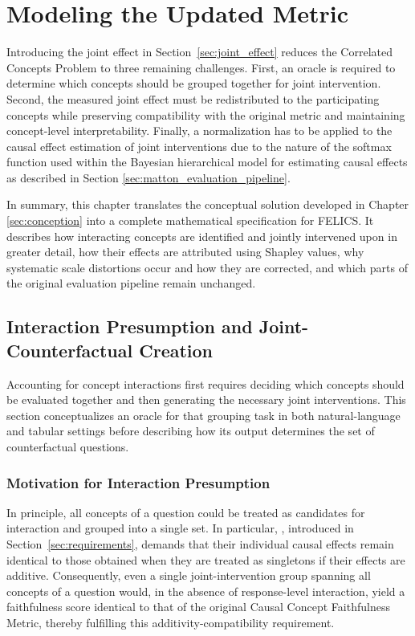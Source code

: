 \chapter{Modeling the Updated Metric}
\label{sec:modeling_updated_metric}
Introducing the joint effect in Section~\ref{sec:joint_effect} reduces the Correlated Concepts Problem to three remaining challenges. First, an oracle is required to determine which concepts should be grouped together for joint intervention. Second, the measured joint effect must be redistributed to the participating concepts while preserving compatibility with the original metric and maintaining concept-level interpretability. Finally, a normalization has to be applied to the causal effect estimation of joint interventions due to the nature of the softmax function used within the Bayesian hierarchical model for estimating causal effects as described in Section \ref{sec:matton_evaluation_pipeline}.

In summary, this chapter translates the conceptual solution developed in Chapter \ref{sec:conception} into a complete mathematical specification for FELICS. It describes how interacting concepts are identified and jointly intervened upon in greater detail, how their effects are attributed using Shapley values, why systematic scale distortions occur and how they are corrected, and which parts of the original evaluation pipeline remain unchanged.

\section{Interaction Presumption and Joint-Counterfactual Creation}
\label{sec:joint_counterfactual}
Accounting for concept interactions first requires deciding which concepts should be evaluated together and then generating the necessary joint interventions. This section conceptualizes an oracle for that grouping task in both natural-language and tabular settings before describing how its output determines the set of counterfactual questions.

\subsection{Motivation for Interaction Presumption}
\label{sec:correlation_identification_motivation}
In principle, all concepts of a question could be treated as candidates for interaction and grouped into a single set. In particular, , introduced in Section~\ref{sec:requirements}, demands that their individual causal effects remain identical to those obtained when they are treated as singletons if their effects are additive. Consequently, even a single joint-intervention group spanning all concepts of a question would, in the absence of response-level interaction, yield a faithfulness score identical to that of the original Causal Concept Faithfulness Metric, thereby fulfilling this additivity-compatibility requirement.

